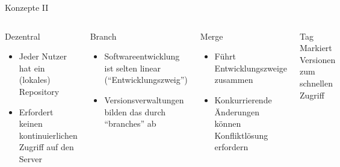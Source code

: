 \begin{frame}{Konzepte II}
\begin{columns}
			\begin{block}{Dezentral}
				\begin{itemize}
					\item Jeder Nutzer hat ein (lokales) Repository \\
					\item Erfordert keinen kontinuierlichen Zugriff auf den Server
				\end{itemize}
			\end{block}
			\begin{block}{Branch}
				\begin{itemize}
					\item Softwareentwicklung ist selten linear (\enquote{Entwicklungszweig})
					\item Versionsverwaltungen bilden das durch \enquote{branches} ab
				\end{itemize}
			\end{block}
			\begin{block}{Merge}
				\begin{itemize}
					\item Führt Entwicklungszweige zusammen
					\item Konkurrierende Änderungen können Konfliktlösung erfordern
				\end{itemize}
			\end{block}
			\begin{block}{Tag}
				Markiert Versionen zum schnellen Zugriff
			\end{block}
\end{columns}
\end{frame}

